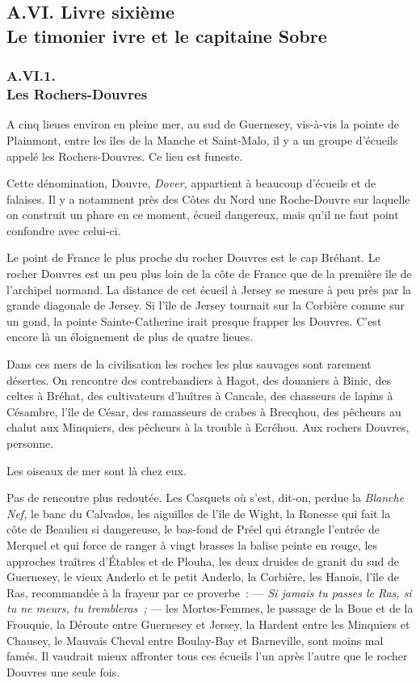 \documentclass[french,twoside]{book} %
\begin{document}
 \subsection[{A.VI. Livre sixième. Le timonier ivre et le capitaine Sobre}]{A.VI. Livre sixième \\
Le timonier ivre et le capitaine Sobre}
  \subsubsection[{A.VI.1. Les Rochers-Douvres}]{A.VI.1. \\
Les Rochers-Douvres}
\noindent A cinq lieues environ en pleine mer, au sud de Guernesey, vis-à-vis la pointe de Plainmont, entre les îles de la Manche et Saint-Malo, il y a un groupe d’écueils appelé les Rochers-Douvres. Ce lieu est funeste.\par
Cette dénomination, Douvre, \emph{Dover,} appartient à beaucoup d’écueils et de falaises. Il y a notamment près des Côtes du Nord une Roche-Douvre sur laquelle on construit un phare en ce moment, écueil dangereux, mais qu’il ne faut point confondre avec celui-ci.\par
Le point de France le plus proche du rocher Douvres est le cap Bréhant. Le rocher Douvres est un peu plus loin de la côte de France que de la première île de l’archipel normand. La distance de cet écueil à Jersey se mesure à peu près par la grande diagonale de Jersey. Si l’île de Jersey tournait sur la Corbière  comme sur un gond, la pointe Sainte-Catherine irait presque frapper les Douvres. C’est encore là un éloignement de plus de quatre lieues.\par
Dans ces mers de la civilisation les roches les plus sauvages sont rarement désertes. On rencontre des contrebandiers à Hagot, des douaniers à Binic, des celtes à Bréhat, des cultivateurs d’huîtres à Cancale, des chasseurs de lapins à Césambre, l’île de César, des ramasseurs de crabes à Brecqhou, des pêcheurs au chalut aux Minquiers, des pêcheurs à la trouble à Ecréhou. Aux rochers Douvres, personne.\par
Les oiseaux de mer sont là chez eux.\par
Pas de rencontre plus redoutée. Les Casquets où s’est, dit-on, perdue la \emph{Blanche Nef,} le banc du Calvados, les aiguilles de l’île de Wight, la Ronesse qui fait la côte de Beaulieu si dangereuse, le bas-fond de Préel qui étrangle l’entrée de Merquel et qui force de ranger à vingt brasses la balise peinte en rouge, les approches traîtres d’Étables et de Plouha, les deux druides de granit du sud de Guernesey, le vieux Anderlo et le petit Anderlo, la Corbière, les Hanois, l’île de Ras, recommandée à la frayeur par ce proverbe : — \emph{Si jamais tu passes le Ras, si tu ne meurs, tu trembleras ;} — les Mortes-Femmes, le passage de la Boue et de la Frouquie, la Déroute entre Guernesey et Jersey, la Hardent entre les Minquiers et Chausey, le Mauvais Cheval entre Boulay-Bay et Barneville, sont moins mal famés. Il vaudrait mieux affronter tous ces écueils l’un après l’autre que le rocher Douvres une seule fois.\par
\end{document}
